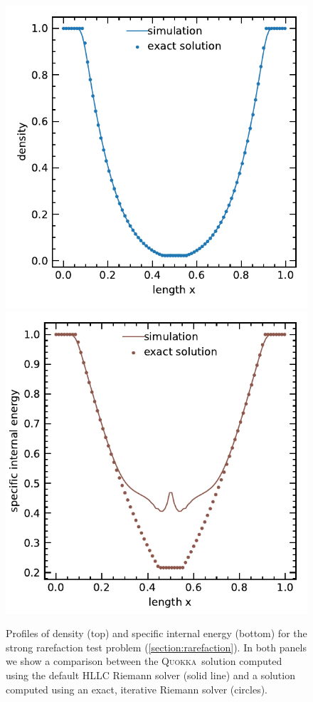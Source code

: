 \documentclass[fleqn,usenatbib]{mnras}
\newcommand{\quokka}{\textsc{Quokka}}
\begin{document}
\begin{figure}
    \includegraphics[width=\columnwidth]{hydro_vacuum_0.1500.pdf}
    \includegraphics[width=\columnwidth]{hydro_vacuum_eint_0.1500.pdf}
    \caption{Profiles of density (top) and specific internal energy (bottom) for the strong rarefaction test problem (\autoref{section:rarefaction}). In both panels we show a comparison between the \quokka~solution computed using the default HLLC Riemann solver (solid line) and a solution computed using an exact, iterative Riemann solver (circles).}
    \label{fig:vacuum}
\end{figure}
\end{document}
